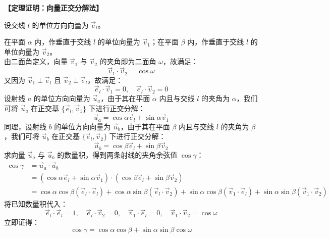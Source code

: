 \documentclass[11pt,a4paper]{ctexart}
\begin{document}
\begin{center}
\end{center}

\noindent\textbf{【定理证明：向量正交分解法】}\par
设交线 $l$ 的单位方向向量为 $\vec{e}_l$。\par
在平面 $\alpha$ 内，作垂直于交线 $l$ 的单位向量为 $\vec{v}_1$；在平面 $\beta$ 内，作垂直于交线 $l$ 的单位向量为 $\vec{v}_2$。\\
由二面角定义，向量 $\vec{v}_1$ 与 $\vec{v}_2$ 的夹角即为二面角 $\omega$，故满足：
\[ \vec{v}_1 \cdot \vec{v}_2 = \cos\omega \]
又因为 $\vec{v}_1 \perp \vec{e}_l$ 且 $\vec{v}_2 \perp \vec{e}_l$，故满足：
\[ \vec{e}_l \cdot \vec{v}_1 = 0, \quad \vec{e}_l \cdot \vec{v}_2 = 0 \]
设射线 $a$ 的单位方向向量为 $\vec{u}_a$，由于其在平面 $\alpha$ 内且与交线 $l$ 的夹角为 $\alpha$，我们可将 $\vec{u}_a$ 在正交基 $\{\vec{e}_l, \vec{v}_1\}$ 下进行正交分解：
\[ \vec{u}_a = \cos\alpha \vec{e}_l + \sin\alpha \vec{v}_1 \]
同理，设射线 $b$ 的单位方向向量为 $\vec{u}_b$，由于其在平面 $\beta$ 内且与交线 $l$ 的夹角为 $\beta$，我们可将 $\vec{u}_b$ 在正交基 $\{\vec{e}_l, \vec{v}_2\}$ 下进行正交分解：
\[ \vec{u}_b = \cos\beta \vec{e}_l + \sin\beta \vec{v}_2 \]
求向量 $\vec{u}_a$ 与 $\vec{u}_b$ 的数量积，得到两条射线的夹角余弦值 $\cos\gamma$：
\[
\begin{aligned}
\cos\gamma &= \vec{u}_a \cdot \vec{u}_b \\
&= (\cos\alpha \vec{e}_l + \sin\alpha \vec{v}_1) \cdot (\cos\beta \vec{e}_l + \sin\beta \vec{v}_2) \\
&= \cos\alpha \cos\beta (\vec{e}_l \cdot \vec{e}_l) + \cos\alpha \sin\beta (\vec{e}_l \cdot \vec{v}_2) + \sin\alpha \cos\beta (\vec{v}_1 \cdot \vec{e}_l) + \sin\alpha \sin\beta (\vec{v}_1 \cdot \vec{v}_2)
\end{aligned}
\]
将已知数量积代入：
\[ \vec{e}_l \cdot \vec{e}_l = 1, \quad \vec{e}_l \cdot \vec{v}_2 = 0, \quad \vec{v}_1 \cdot \vec{e}_l = 0, \quad \vec{v}_1 \cdot \vec{v}_2 = \cos\omega \]
立即证得：
\[ \cos\gamma = \cos\alpha \cos\beta + \sin\alpha \sin\beta \cos\omega \]
\end{document}
